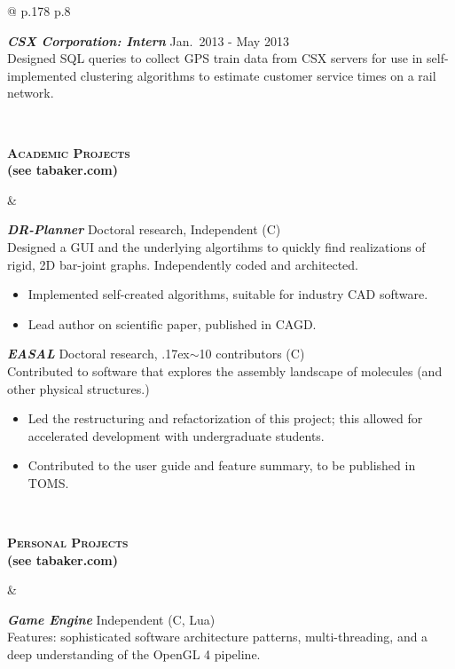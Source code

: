 \documentclass[10pt]{article}
\def\mytilde{{\raise.17ex\hbox{$\scriptstyle\mathtt{\sim}$}}}
\def\cpp{{C\nolinebreak[4]\hspace{-.05em}\raisebox{.4ex}{\tiny\bf ++}}}
\newcommand{\titlecell}[1]{%
  \begin{minipage}[t]{\linewidth}
    \raggedleft \textbf{#1}
\end{minipage}}
\newcommand{\contentcell}[1]{%
  \begin{minipage}[t]{\linewidth}
    #1
\end{minipage}}
\newcommand{\tablerowskip}{\vspace{4.83mm} \\}
\newcommand{\projectskip}{\vspace{3mm}}
\newcommand{\contentcellheader}[1]{\textbf{\textsl{#1}}}
\begin{document}
\begin{tabular}{@{} p{.178\textwidth} p{.8\textwidth}}
          \contentcell{
            \contentcellheader{CSX Corporation: Intern} \hfill Jan.\ 2013 - May 2013 \\
            Designed SQL queries to collect GPS train data from CSX servers for use in self-implemented clustering algorithms to estimate customer service times on a rail network.
          }
          \tablerowskip

          \titlecell{\textsc{Academic Projects} \\ {\small (see tabaker.com)}} &
          \contentcell{
            \contentcellheader{DR-Planner} \hfill Doctoral research, Independent (\cpp)
            \\ Designed a GUI and the underlying algortihms to quickly find realizations of rigid, 2D bar-joint graphs. Independently coded and architected.
            \begin{itemize}[itemsep=0pt,topsep=0pt,leftmargin=*] \itemsep -2pt
            \item Implemented self-created algorithms, suitable for industry CAD software.
            \item Lead author on scientific paper, published in CAGD.
            \end{itemize}
            \projectskip

            \contentcellheader{EASAL} \hfill Doctoral research, \mytilde 10 contributors (\cpp)
            \\ Contributed to software that explores the assembly landscape of molecules (and other physical structures.)
            \begin{itemize}[itemsep=0pt,topsep=0pt,leftmargin=*] \itemsep -2pt
            \item Led the restructuring and refactorization of this project; this allowed for accelerated development with undergraduate students.
            \item Contributed to the user guide and feature summary, to be published in TOMS.
            \end{itemize}
          }
          \tablerowskip

          \titlecell{\textsc{Personal Projects} \\ {\small (see tabaker.com)}} &
          \contentcell{
            \contentcellheader{Game Engine} \hfill Independent (\cpp, Lua)
            \\ Features: sophisticated software architecture patterns, multi-threading, and a deep understanding of the OpenGL 4
            pipeline.
            \projectskip

}
\end{tabular}
\end{document}
